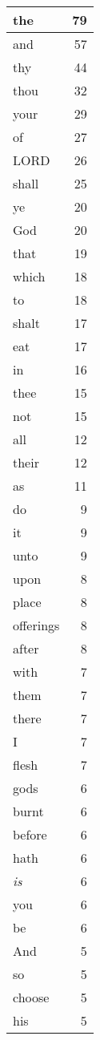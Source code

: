 \begin{center}
\begin{longtable}{l|r}
\hline \hline
\endlastfoot
the & 79 \\ \hline
and & 57 \\ \hline
thy & 44 \\ \hline
thou & 32 \\ \hline
your & 29 \\ \hline
of & 27 \\ \hline
LORD & 26 \\ \hline
shall & 25 \\ \hline
ye & 20 \\ \hline
God & 20 \\ \hline
that & 19 \\ \hline
which & 18 \\ \hline
to & 18 \\ \hline
shalt & 17 \\ \hline
eat & 17 \\ \hline
in & 16 \\ \hline
thee & 15 \\ \hline
not & 15 \\ \hline
all & 12 \\ \hline
their & 12 \\ \hline
as & 11 \\ \hline
do & 9 \\ \hline
it & 9 \\ \hline
unto & 9 \\ \hline
upon & 8 \\ \hline
place & 8 \\ \hline
offerings & 8 \\ \hline
after & 8 \\ \hline
with & 7 \\ \hline
them & 7 \\ \hline
there & 7 \\ \hline
I & 7 \\ \hline
flesh & 7 \\ \hline
gods & 6 \\ \hline
burnt & 6 \\ \hline
before & 6 \\ \hline
hath & 6 \\ \hline
\emph{is} & 6 \\ \hline
you & 6 \\ \hline
be & 6 \\ \hline
And & 5 \\ \hline
so & 5 \\ \hline
choose & 5 \\ \hline
his & 5 \\ \hline

\end{longtable}
\end{center}
